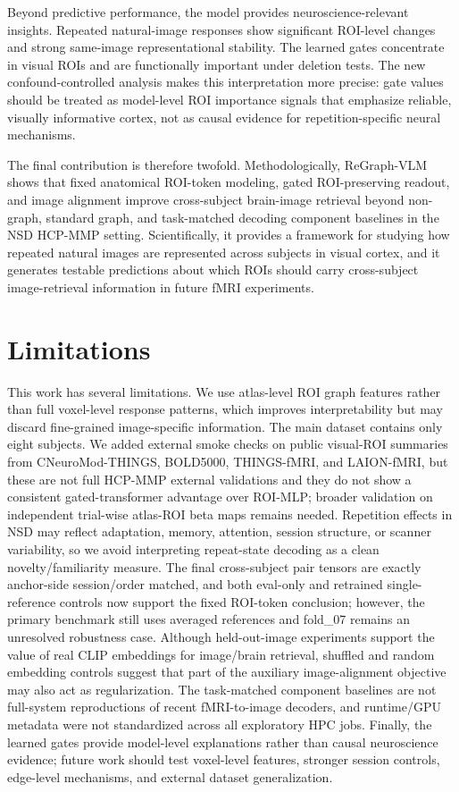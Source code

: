 \documentclass{article}
\begin{document}
Beyond predictive performance, the model provides neuroscience-relevant insights. Repeated natural-image responses show significant ROI-level changes and strong same-image representational stability. The learned gates concentrate in visual ROIs and are functionally important under deletion tests. The new confound-controlled analysis makes this interpretation more precise: gate values should be treated as model-level ROI importance signals that emphasize reliable, visually informative cortex, not as causal evidence for repetition-specific neural mechanisms.

The final contribution is therefore twofold. Methodologically, ReGraph-VLM shows that fixed anatomical ROI-token modeling, gated ROI-preserving readout, and image alignment improve cross-subject brain-image retrieval beyond non-graph, standard graph, and task-matched decoding component baselines in the NSD HCP-MMP setting. Scientifically, it provides a framework for studying how repeated natural images are represented across subjects in visual cortex, and it generates testable predictions about which ROIs should carry cross-subject image-retrieval information in future fMRI experiments.

\section{Limitations}
\label{sec:limitations}

This work has several limitations. We use atlas-level ROI graph features rather than full voxel-level response patterns, which improves interpretability but may discard fine-grained image-specific information. The main dataset contains only eight subjects. We added external smoke checks on public visual-ROI summaries from CNeuroMod-THINGS, BOLD5000, THINGS-fMRI, and LAION-fMRI, but these are not full HCP-MMP external validations and they do not show a consistent gated-transformer advantage over ROI-MLP; broader validation on independent trial-wise atlas-ROI beta maps remains needed. Repetition effects in NSD may reflect adaptation, memory, attention, session structure, or scanner variability, so we avoid interpreting repeat-state decoding as a clean novelty/familiarity measure. The final cross-subject pair tensors are exactly anchor-side session/order matched, and both eval-only and retrained single-reference controls now support the fixed ROI-token conclusion; however, the primary benchmark still uses averaged references and fold\_07 remains an unresolved robustness case. Although held-out-image experiments support the value of real CLIP embeddings for image/brain retrieval, shuffled and random embedding controls suggest that part of the auxiliary image-alignment objective may also act as regularization. The task-matched component baselines are not full-system reproductions of recent fMRI-to-image decoders, and runtime/GPU metadata were not standardized across all exploratory HPC jobs. Finally, the learned gates provide model-level explanations rather than causal neuroscience evidence; future work should test voxel-level features, stronger session controls, edge-level mechanisms, and external dataset generalization.



\end{document}
